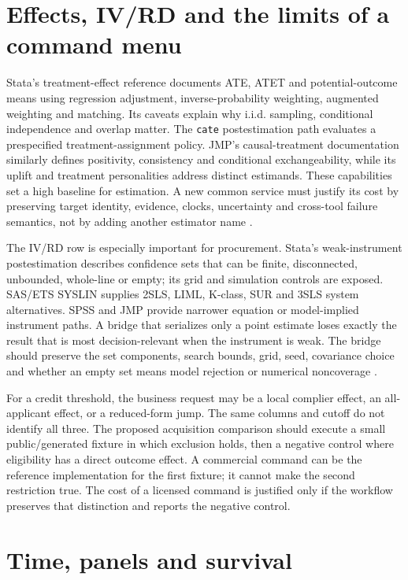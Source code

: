 \section{Effects, IV/RD and the limits of a command menu}
\label{exec17:s8-effects}

Stata's treatment-effect reference documents ATE, ATET and potential-outcome
means using regression adjustment, inverse-probability weighting, augmented
weighting and matching. Its caveats explain why i.i.d. sampling, conditional
independence and overlap matter. The \texttt{cate} postestimation path
evaluates a prespecified treatment-assignment policy. JMP's causal-treatment
documentation similarly defines positivity, consistency and conditional
exchangeability, while its uplift and treatment personalities address distinct
estimands. These capabilities set a high baseline for estimation. A new common
service must justify its cost by preserving target identity, evidence, clocks,
uncertainty and cross-tool failure semantics, not by adding another estimator
name \citep{exec13_ch_stata,exec13_ch_jmp_causal,exec13_ch_jmp_uplift}.

The IV/RD row is especially important for procurement. Stata's weak-instrument
postestimation describes confidence sets that can be finite, disconnected,
unbounded, whole-line or empty; its grid and simulation controls are exposed.
SAS/ETS SYSLIN supplies 2SLS, LIML, K-class, SUR and 3SLS system alternatives.
SPSS and JMP provide narrower equation or model-implied instrument paths. A
bridge that serializes only a point estimate loses exactly the result that is
most decision-relevant when the instrument is weak. The bridge should preserve
the set components, search bounds, grid, seed, covariance choice and whether an
empty set means model rejection or numerical noncoverage
\citep{exec13_ivrd_stata,exec13_ivrd_sas}.

For a credit threshold, the business request may be a local complier effect,
an all-applicant effect, or a reduced-form jump. The same columns and cutoff do
not identify all three. The proposed acquisition comparison should execute a
small public/generated fixture in which exclusion holds, then a negative control
where eligibility has a direct outcome effect. A commercial command can be the
reference implementation for the first fixture; it cannot make the second
restriction true. The cost of a licensed command is justified only if the
workflow preserves that distinction and reports the negative control.

\section{Time, panels and survival}
\label{exec17:s8-temporal}

